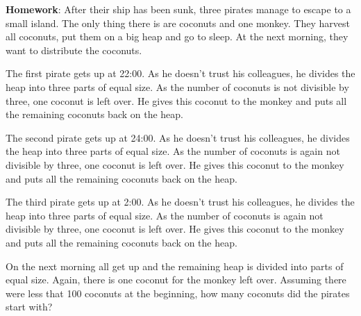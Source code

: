 \documentclass{article}
\begin{document}
\noindent
\textbf{Homework}:
After their ship has been sunk, three pirates manage to escape to a small island.
The only thing there is are coconuts and one monkey.  They harvest all coconuts, put them
on a big heap and go to sleep.  At the next morning, they want to distribute the coconuts.
 
The first pirate gets up at  22:00.  As he doesn't trust his colleagues, he divides the
heap into three parts of equal size.  As the number of coconuts is not divisible by three, one
coconut is left over.  He gives this coconut to the monkey and puts all the remaining
coconuts back on the heap.

The second pirate gets up at  24:00.  As he doesn't trust his colleagues, he divides the
heap into three parts of equal size.  As the number of coconuts is again not divisible by three, one
coconut is left over.  He gives this coconut to the monkey and puts all the remaining
coconuts back on the heap.

The third pirate gets up at  2:00.  As he doesn't trust his colleagues, he divides the
heap into three parts of equal size.  As the number of coconuts is again not divisible by three, one
coconut is left over.  He gives this coconut to the monkey and puts all the remaining
coconuts back on the heap.

On the next morning all get up and the remaining heap is divided into parts of equal size.
Again, there is one coconut for the monkey left over.  Assuming there were less that 100
coconuts at the beginning, how many coconuts did the pirates start with?
\vspace{0.2cm}
\end{document}
